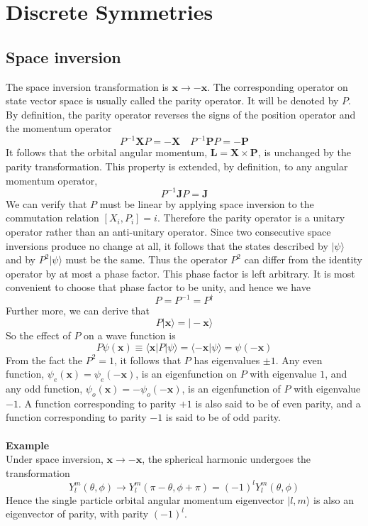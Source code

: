 \chapter{Discrete Symmetries}
\section{Space inversion}
The space inversion transformation is $\bm{x} \to -\bm{x}$. The corresponding operator on state vector space is usually called the parity operator. It will be denoted by $P$. By definition, the parity operator reverses the signs of the position operator and the momentum operator
\[P^{-1}\bm{X}P = -\bm{X} \quad P^{-1}\bm{P}P = -\bm{P}\]
It follows that the orbital angular momentum, $\bm{L} = \bm{X}\times\bm{P}$, is unchanged by the parity transformation. This property is extended, by definition, to any angular momentum operator,
\[P^{-1}\bm{J}P = \bm{J}\]
We can verify that $P$ must be linear by applying space inversion to the commutation relation $[X_i,P_i] = i$. Therefore the parity operator is a unitary operator rather than an anti-unitary operator. Since two consecutive space inversions produce no change at all, it follows that the states described by $|\psi\rangle$ and by $P^2|\psi\rangle$ must be the same. Thus the
operator $P^2$ can differ from the identity operator by at most a phase factor. This phase factor is left arbitrary. It is most convenient to choose that phase factor to be unity, and hence we have
\[P = P^{-1} = P^{\dagger}\]
Further more, we can derive that
\[P|\bm{x}\rangle = |-\bm{x}\rangle\]
So the effect of $P$ on a wave function is
\[P\psi(\bm{x}) \equiv \langle \bm{x} | P | \psi\rangle = \langle -\bm{x} | \psi\rangle = \psi(-\bm{x})\]
From the fact the $P^2=1$, it follows that $P$ has eigenvalues $\pm 1$. Any even function, $\psi_e(\bm{x}) = \psi_e(-\bm{x})$, is an eigenfunction on $P$ with eigenvalue $1$, and any odd function, $\psi_o(\bm{x}) = -\psi_o(-\bm{x})$, is an eigenfunction of $P$ with eigenvalue $-1$.
A function corresponding to parity $+1$ is also said to be of even parity, and a function corresponding to parity $-1$ is said to be of odd parity.\\ \\
\textbf{Example}\\
Under space inversion, $\bm{x} \to -\bm{x}$, the spherical harmonic undergoes the transformation
\[Y_l^m(\theta,\phi) \to Y_l^m(\pi-\theta,\phi+\pi) = (-1)^l Y_l^m(\theta,\phi)\]
Hence the single particle orbital angular momentum eigenvector $|l,m\rangle$ is also an eigenvector of parity, with parity $(-1)^l$.\\
